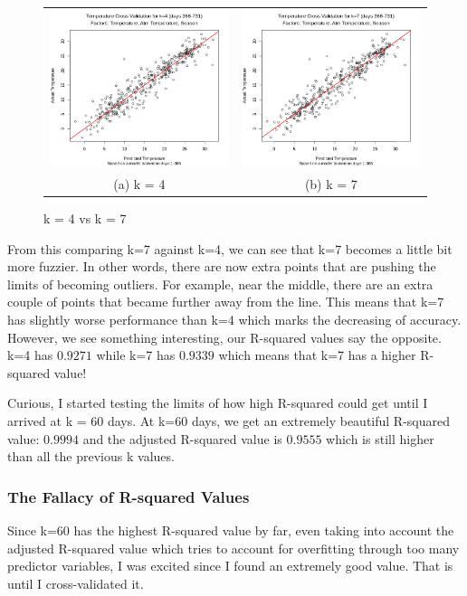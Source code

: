 \documentclass[12pt]{article}
\begin{document}
\begin{figure}[H]
\begin{tabular}{cc}
  \includegraphics[width=.5\linewidth]{tempxvalidk=4.png} &   \includegraphics[width=.5\linewidth]{tempxvalidk=7.png} \\
(a) k = 4 & (b) k = 7 \\[6pt]
\end{tabular}
\caption{k = 4 vs k = 7}
\end{figure}

From this comparing k=7 against k=4, we can see that k=7 becomes a little bit more fuzzier. In other words, there are now extra points that are pushing the limits of becoming outliers. For example, near the middle, there are an extra couple of points that became further away from the line. This means that k=7 has slightly worse performance than k=4 which marks the decreasing of accuracy. However, we see something interesting, our R-squared values say the opposite. k=4 has $0.9271$ while k=7 has $0.9339$ which means that k=7 has a higher R-squared value!

Curious, I started testing the limits of how high R-squared could get until I arrived at k = 60 days. At k=60 days, we get an extremely beautiful R-squared value: $0.9994$ and the adjusted R-squared value is $0.9555$ which is still higher than all the previous k values.

\subsubsection{The Fallacy of R-squared Values}
Since k=60 has the highest R-squared value by far, even taking into account the adjusted R-squared value which tries to account for overfitting through too many predictor variables, I was excited since I found an extremely good value. That is until I cross-validated it.	
\end{document}
